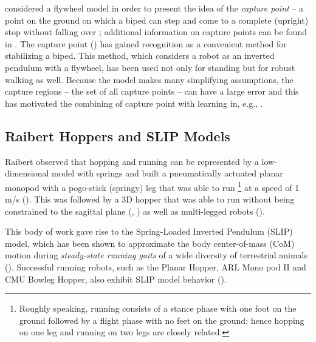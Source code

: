 %
\cite{Pratt2006} considered a flywheel model in order to present the idea of the {\em capture point} -- a point on the ground on which a biped can step and come to a complete (upright) stop without falling over%
; additional information on capture points can be found in \cite{Koolen2012,Pratt2012}.
%
The capture point (\cite{Pratt2006a}) has gained recognition as a convenient method for stabilizing a biped.
%
%
This method, which considers a robot as an inverted pendulum with a flywheel, has been used not only for standing but for robust walking as well.
%
Because the model makes many simplifying assumptions, the capture regions -- the set of all capture points -- can have a large error and this has motivated the combining of capture point with learning in, e.g., \cite{Rebula2007}.

\subsection{Raibert Hoppers and SLIP Models}

Raibert observed that hopping and running can be represented by a low-dimensional model with springs and built a pneumatically actuated planar monopod with a pogo-stick (springy) leg that was able to run%
%
\footnote{Roughly speaking, running consists of a stance phase with one foot on the ground followed by a flight phase with no feet on the ground; hence hopping on one leg and running on two legs are closely related.}\xspace
%
at a speed of 1 m/s (\cite{Raibert1984,Raibert1984a,Raibert1986}).
%
This was followed by a 3D hopper that was able to run without being constrained to the sagittal plane (\cite[Chap.~3]{Raibert1986}, \cite{raibert:dbu}) as well as multi-legged robots (\cite{raibert1986a,Raibert1990,Hodgins1991}).
%

This body of work gave rise to the Spring-Loaded Inverted Pendulum (SLIP) model, which has been shown to approximate the body center-of-mass (CoM) motion during \textit{steady-state running gaits} of a wide diversity of terrestrial animals (\cite{Blickhan89_springmass, Mcmahon90_slip,Farley93_animal_size, full00_rhythmic,DIFAFU00,Seyfarth01_stability}).
%
Successful running robots, such as the Planar Hopper, ARL Mono pod II and CMU Bowleg Hopper, also exhibit SLIP model behavior (\cite{RA86a, Zeglin98_bowleg, AHBU06}).
%

